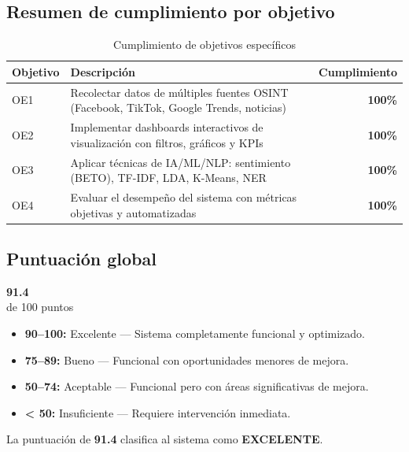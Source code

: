 \documentclass[11pt,a4paper]{article}
\begin{document}
\subsection{Resumen de cumplimiento por objetivo}

\begin{table}[H]
\centering
\begin{tabularx}{\textwidth}{l X r}
\toprule
\textbf{Objetivo} & \textbf{Descripción} & \textbf{Cumplimiento} \\
\midrule
OE1 & Recolectar datos de múltiples fuentes OSINT (Facebook, TikTok, Google Trends, noticias) & \textcolor{successgreen}{\textbf{100\%}} \\
\rowcolor{tablerow}
OE2 & Implementar dashboards interactivos de visualización con filtros, gráficos y KPIs & \textcolor{successgreen}{\textbf{100\%}} \\
OE3 & Aplicar técnicas de IA/ML/NLP: sentimiento (BETO), TF-IDF, LDA, K-Means, NER & \textcolor{successgreen}{\textbf{100\%}} \\
\rowcolor{tablerow}
OE4 & Evaluar el desempeño del sistema con métricas objetivas y automatizadas & \textcolor{successgreen}{\textbf{100\%}} \\
\bottomrule
\end{tabularx}
\caption{Cumplimiento de objetivos específicos}
\end{table}

\subsection{Puntuación global}

\begin{center}
\begin{tcolorbox}[colback=emiblue!5, colframe=emiblue, width=6cm, halign=center, boxrule=1pt, arc=5pt]
  {\fontsize{48}{52}\selectfont\bfseries\color{emiblue}91.4}\\[4pt]
  {\Large\color{gray}de 100 puntos}
\end{tcolorbox}
\end{center}

\begin{infobox}
\begin{itemize}
  \item \textbf{90--100:} Excelente — Sistema completamente funcional y optimizado.
  \item \textbf{75--89:} Bueno — Funcional con oportunidades menores de mejora.
  \item \textbf{50--74:} Aceptable — Funcional pero con áreas significativas de mejora.
  \item \textbf{< 50:} Insuficiente — Requiere intervención inmediata.
\end{itemize}
La puntuación de \textbf{91.4} clasifica al sistema como \textcolor{successgreen}{\textbf{EXCELENTE}}.
\end{infobox}
\end{document}
